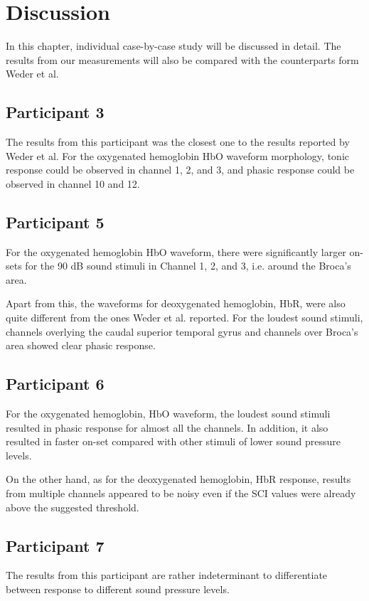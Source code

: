 \chapter{Discussion}
In this chapter, individual case-by-case study will be discussed in detail. The results from our measurements will also be compared with the counterparts form Weder et al.

\section {Participant 3}
The results from this participant was the closest one to the results reported by Weder et al. For the oxygenated hemoglobin HbO waveform morphology, tonic response could be observed in channel 1, 2, and 3, and phasic response could be observed in channel 10 and 12.

\section {Participant 5}
For the oxygenated hemoglobin HbO waveform, there were significantly larger on-sets for the 90 dB sound stimuli in Channel 1, 2, and 3, i.e. around the Broca's area.

Apart from this, the waveforms for deoxygenated hemoglobin, HbR, were also quite different from the ones Weder et al. reported. For the loudest sound stimuli, channels overlying the caudal superior temporal gyrus and channels over Broca's area showed clear phasic response. 

\section {Participant 6}

For the oxygenated hemoglobin, HbO waveform, the loudest sound stimuli resulted in phasic response for almost all the channels. In addition, it also resulted in faster on-set compared with other stimuli of lower sound pressure levels.

On the other hand, as for the deoxygenated hemoglobin, HbR response, results from multiple channels appeared to be noisy even if the SCI values were already above the suggested threshold.


\section {Participant 7}

The results from this participant are rather indeterminant to differentiate between response to different sound pressure levels.


